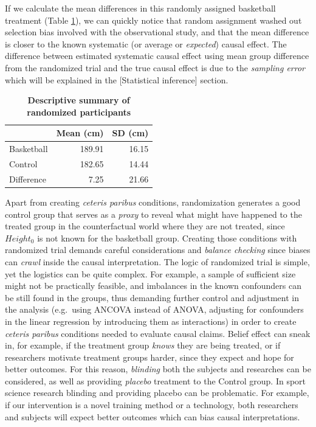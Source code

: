 \documentclass[
]{book}
\begin{document}
If we calculate the mean differences in this randomly assigned basketball treatment (Table \ref{tab:basketball-randomized-summary}), we can quickly notice that random assignment washed out selection bias involved with the observational study, and that the mean difference is closer to the known systematic (or average or \emph{expected}) causal effect. The difference between estimated systematic causal effect using mean group difference from the randomized trial and the true causal effect is due to the \emph{sampling error} which will be explained in the {[}Statistical inference{]} section.



\begin{table}

\caption{\label{tab:basketball-randomized-summary}\textbf{Descriptive summary of randomized participants}}
\centering
\begin{tabular}[t]{lrr}
\toprule
 & Mean (cm) & SD (cm)\\
\midrule
Basketball & 189.91 & 16.15\\
Control & 182.65 & 14.44\\
Difference & 7.25 & 21.66\\
\bottomrule
\end{tabular}
\end{table}

Apart from creating \emph{ceteris paribus} conditions, randomization generates a good control group that serves as a \emph{proxy} to reveal what might have happened to the treated group in the counterfactual world where they are not treated, since \(Height_0\) is not known for the basketball group. Creating those conditions with randomized trial demands careful considerations and \emph{balance checking} since biases can \emph{crawl} inside the causal interpretation. The logic of randomized trial is simple, yet the logistics can be quite complex. For example, a sample of sufficient size might not be practically feasible, and imbalances in the known confounders can be still found in the groups, thus demanding further control and adjustment in the analysis (e.g.~using ANCOVA instead of ANOVA, adjusting for confounders in the linear regression by introducing them as interactions) in order to create \emph{ceteris paribus} conditions needed to evaluate causal claims. Belief effect can sneak in, for example, if the treatment group \emph{knows} they are being treated, or if researchers motivate treatment groups harder, since they expect and hope for better outcomes. For this reason, \emph{blinding} both the subjects and researches can be considered, as well as providing \emph{placebo} treatment to the Control group. In sport science research blinding and providing placebo can be problematic. For example, if our intervention is a novel training method or a technology, both researchers and subjects will expect better outcomes which can bias causal interpretations.
\end{document}
